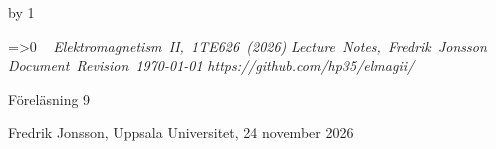 {{{{{\cleardoublepage
%
%
%
%
%
%
%
\def\coursename{Elektromagnetism II}
\def\coursecode{1TE626}
\def\courseyear{2026}
\def\courserepo{https://github.com/hp35/elmagii/}
\def\lecturenumber{9}
\def\lecturetitle{Maxwells ekvationer och v{\aa}gutbredning}
\def\lecturesubtitle{}
\def\lectureauthor{Fredrik Jonsson}
\def\lectureplace{Uppsala Universitet}
\def\lecturedate{24 november 2026}
\edef\expandedlecturenumber{9}
\def\ifempty#1{\ifx\relax#1\relax}
\advance\chapno by 1
\immediate{}
\hsize=150mm\hoffset=4.6mm\vsize=230mm\voffset=7mm
\topskip=0pt\baselineskip=12pt\parskip=0pt\leftskip=0pt\parindent=15pt
\ifcolors
  \voffset=-10.2mm\topskip=0pt
\fi
\headline={\ifnum\secno>0\ifodd\pageno\rightheadline\else\leftheadline\fi
  \else\hfill\fi}
\def\rightheadline{\tenrm{\it F\"orel\"asning 9}
  \hfil{\it \coursename, \coursecode\ (\courseyear)}}
\def\leftheadline{\tenrm{\it \coursename, \coursecode\ (\courseyear)}
  \hfil{\it F\"orel\"asning 9}}
\noindent~\vskip-60pt\hskip-40pt{}
\vskip-42pt\hfill\vbox{
    \hbox{{\it \coursename, \coursecode\ (\courseyear)}}
    \hbox{{\it Lecture Notes, \lectureauthor}}
    \hbox{{\it Document Revision \today}}
    \hbox{{\it \courserepo}}}\vskip 36pt
\centerline{\twelvesc F\"orel\"asning 9}
\vskip 24pt\noindent
\centerline{}
\expandafter\ifempty\expandafter{\lecturesubtitle}%
  \else\centerline{\twelvesc\lecturesubtitle}\fi
\bigskip
\centerline{\lectureauthor, \lectureplace, \lecturedate}
\vskip24pt



}}}}}
